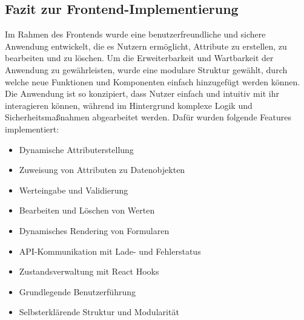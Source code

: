 \subsection{Fazit zur Frontend-Implementierung}
Im Rahmen des Frontends wurde eine benutzerfreundliche und sichere Anwendung entwickelt, die es Nutzern ermöglicht, Attribute zu erstellen, zu bearbeiten und zu löschen.
Um die Erweiterbarkeit und Wartbarkeit der Anwendung zu gewährleisten, wurde eine modulare Struktur gewählt, durch welche neue Funktionen und Komponenten einfach hinzugefügt
werden können. Die Anwendung ist so konzipiert, dass Nutzer einfach und intuitiv mit ihr interagieren können, während im Hintergrund komplexe Logik und Sicherheitsmaßnahmen
abgearbeitet werden. Dafür wurden folgende Features implementiert:
\begin{itemize}
    \item Dynamische Attributerstellung
    \item Zuweisung von Attributen zu Datenobjekten
    \item Werteingabe und Validierung
    \item Bearbeiten und Löschen von Werten
    \item Dynamisches Rendering von Formularen
    \item API-Kommunikation mit Lade- und Fehlerstatus
    \item Zustandsverwaltung mit React Hooks
    \item Grundlegende Benutzerführung
    \item Selbsterklärende Struktur und Modularität
\end{itemize}
